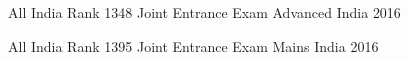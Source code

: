 \begin{cvhonors}

  \cvhonor
  {All India Rank 1348}
  {Joint Entrance Exam Advanced}
  {India}
  {2016}

  \cvhonor
  {All India Rank 1395}
  {Joint Entrance Exam Mains}
  {India}
  {2016}

\end{cvhonors}

